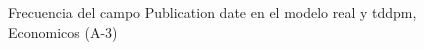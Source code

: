 \begin{figure}[H]
    \centering
    
    \caption{Frecuencia del campo Publication date en el modelo real y tddpm, Economicos (A-3)}
    \label{frecuency-Publication Date-tddpm_mlp}
\end{figure}